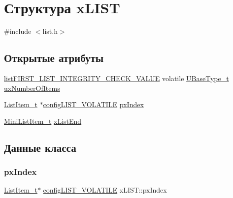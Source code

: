\hypertarget{structx_l_i_s_t}{}\section{Структура x\+L\+I\+ST}
\label{structx_l_i_s_t}


{\ttfamily \#include $<$list.\+h$>$}

\subsection*{Открытые атрибуты}
\begin{DoxyCompactItemize}
\item 
\mbox{\hyperlink{list_8h_a3a52b5a4f70d3a07e37a5814a23ba880}{list\+F\+I\+R\+S\+T\+\_\+\+L\+I\+S\+T\+\_\+\+I\+N\+T\+E\+G\+R\+I\+T\+Y\+\_\+\+C\+H\+E\+C\+K\+\_\+\+V\+A\+L\+UE}} volatile \mbox{\hyperlink{portmacro_8h_a646f89d4298e4f5afd522202b11cb2e6}{U\+Base\+Type\+\_\+t}} \mbox{\hyperlink{structx_l_i_s_t_aa280e17bf4e71f81c449c2444cb70378}{ux\+Number\+Of\+Items}}
\item 
\mbox{\hyperlink{list_8h_a1a62d469392f9bfe2443e7efab9c8398}{List\+Item\+\_\+t}} $\ast$\mbox{\hyperlink{list_8h_a2d5de557c5561c8980d1bf51d87d8cba}{config\+L\+I\+S\+T\+\_\+\+V\+O\+L\+A\+T\+I\+LE}} \mbox{\hyperlink{structx_l_i_s_t_a7bf64d87701493b4c8c5c977682500d7}{px\+Index}}
\item 
\mbox{\hyperlink{list_8h_a542a8d55e98bc407593979e61f83cd02}{Mini\+List\+Item\+\_\+t}} \mbox{\hyperlink{structx_l_i_s_t_a49ad62fa153126e27e273811167b336a}{x\+List\+End}}
\end{DoxyCompactItemize}


\subsection{Данные класса}
\mbox{\label{structx_l_i_s_t_a7bf64d87701493b4c8c5c977682500d7}} 
\subsubsection{\texorpdfstring{pxIndex}{pxIndex}}
{\footnotesize\ttfamily \mbox{\hyperlink{list_8h_a1a62d469392f9bfe2443e7efab9c8398}{List\+Item\+\_\+t}}$\ast$ \mbox{\hyperlink{list_8h_a2d5de557c5561c8980d1bf51d87d8cba}{config\+L\+I\+S\+T\+\_\+\+V\+O\+L\+A\+T\+I\+LE}} x\+L\+I\+S\+T\+::px\+Index}

\mbox{\label{structx_l_i_s_t_aa280e17bf4e71f81c449c2444cb70378}} 
